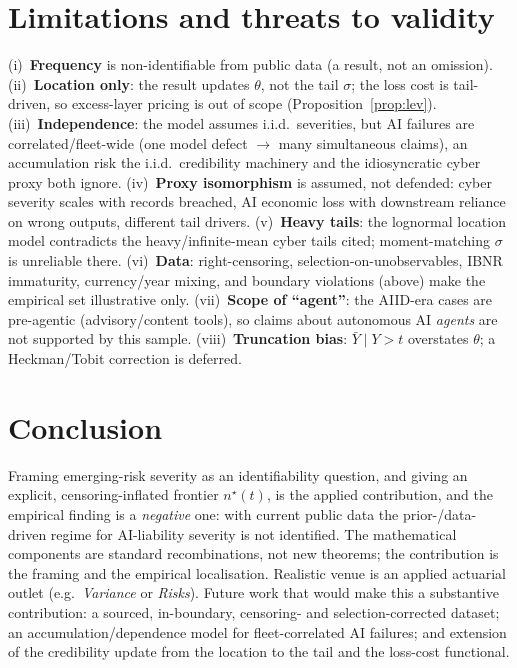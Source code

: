 \documentclass[11pt]{article}
\begin{document}
\section{Limitations and threats to validity}
(i)~\textbf{Frequency} is non-identifiable from public data (a result, not an omission).
(ii)~\textbf{Location only}: the result updates $\theta$, not the tail $\sigma$; the loss cost is
tail-driven, so excess-layer pricing is out of scope (Proposition~\ref{prop:lev}).
(iii)~\textbf{Independence}: the model assumes i.i.d.\ severities, but AI failures are
correlated/fleet-wide (one model defect $\to$ many simultaneous claims), an accumulation risk
the i.i.d.\ credibility machinery and the idiosyncratic cyber proxy both ignore.
(iv)~\textbf{Proxy isomorphism} is assumed, not defended: cyber severity scales with records
breached, AI economic loss with downstream reliance on wrong outputs, different tail drivers.
(v)~\textbf{Heavy tails}: the lognormal location model contradicts the heavy/infinite-mean cyber
tails cited; moment-matching $\sigma$ is unreliable there.
(vi)~\textbf{Data}: right-censoring, selection-on-unobservables, IBNR immaturity, currency/year
mixing, and boundary violations (above) make the empirical set illustrative only.
(vii)~\textbf{Scope of ``agent''}: the AIID-era cases are pre-agentic (advisory/content tools),
so claims about autonomous AI \emph{agents} are not supported by this sample.
(viii)~\textbf{Truncation bias}: $\bar Y\mid Y>t$ overstates $\theta$; a Heckman/Tobit correction
is deferred.

\section{Conclusion}
Framing emerging-risk severity as an identifiability question, and giving an explicit,
censoring-inflated frontier $n^\star(t)$, is the applied contribution, and the empirical finding is a \emph{negative} one: with current public data the prior-/data-driven regime for
AI-liability severity is not identified. The mathematical components are standard recombinations,
not new theorems; the contribution is the framing and the empirical localisation. Realistic venue is an
applied actuarial outlet (e.g.\ \emph{Variance} or \emph{Risks}). Future work that would make this
a substantive contribution: a sourced, in-boundary, censoring- and selection-corrected dataset; an
accumulation/dependence model for fleet-correlated AI failures; and extension of the credibility
update from the location to the tail and the loss-cost functional.
\end{document}
